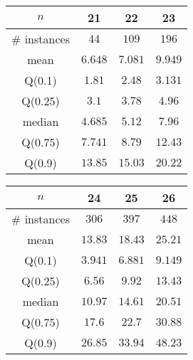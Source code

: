 \begin{tabular}{c|ccc} 
\hline 
$n$ & 21 & 22 & 23 \tabularnewline 
\hline 
\hline 
\# instances & $44$ & $109$ & $196$ \tabularnewline 
mean & $6.648$ & $7.081$ & $9.949$ \tabularnewline 
Q(0.1) & $1.81$ & $2.48$ & $3.131$ \tabularnewline 
Q(0.25) & $3.1$ & $3.78$ & $4.96$ \tabularnewline 
median & $4.685$ & $5.12$ & $7.96$ \tabularnewline 
Q(0.75) & $7.741$ & $8.79$ & $12.43$ \tabularnewline 
Q(0.9) & $13.85$ & $15.03$ & $20.22$ \tabularnewline 
\hline 
\end{tabular} 
\medskip{} 

\begin{tabular}{c|ccc} 
\hline 
$n$ & 24 & 25 & 26 \tabularnewline 
\hline 
\hline 
\# instances & $306$ & $397$ & $448$ \tabularnewline 
mean & $13.83$ & $18.43$ & $25.21$ \tabularnewline 
Q(0.1) & $3.941$ & $6.881$ & $9.149$ \tabularnewline 
Q(0.25) & $6.56$ & $9.92$ & $13.43$ \tabularnewline 
median & $10.97$ & $14.61$ & $20.51$ \tabularnewline 
Q(0.75) & $17.6$ & $22.7$ & $30.88$ \tabularnewline 
Q(0.9) & $26.85$ & $33.94$ & $48.23$ \tabularnewline 
\hline 
\end{tabular} 
\medskip{} 

